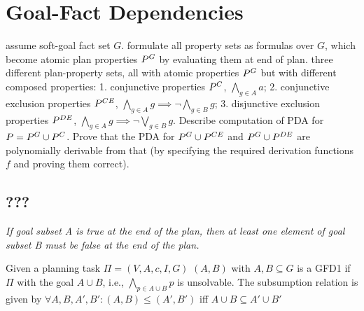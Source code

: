 \section{Goal-Fact Dependencies}


assume soft-goal fact set $G$. formulate all property sets as formulas
over $G$, which become atomic plan properties $P^{G}$ by
evaluating them at end of plan. three different plan-property sets,
all with atomic properties $P^{G}$ but with different composed
properties: 1. conjunctive properties $P^{C}$, $\bigwedge_{g \in
  A} a$; 2. conjunctive exclusion properties $P^{CE}$,
$\bigwedge_{g \in A} g \implies \neg \bigwedge_{g \in B} g$;
3. disjunctive exclusion properties $P^{DE}$, $\bigwedge_{g \in
  A} g \implies \neg \bigvee_{g \in B} g$. Describe computation of PDA
for $P = P^{G} \cup P^{C}$. Prove that the PDA for
$P^{G} \cup P^{CE}$ and $P^{G} \cup P^{DE}$ are
polynomially derivable from that (by specifying the required
derivation functions $f$ and proving them correct). 



\subsection{???}


\emph{If goal subset A is true at the end of the plan, then at least one element of goal subset B
must be false at the end of the plan.}


\begin{definition}
Given a planning task $\Pi = (V,A,c,I,G)$ $(A,B)$ with $A, B \subseteq G$ is a 
GFD1 if $\Pi$ with the goal $A \cup B$, i.e., $\bigwedge_{p \in A \cup B} p$
is unsolvable.
The subsumption relation is given by $\forall A,B,A',B': (A,B) \leq (A',B')$ iff $A \cup B \subseteq 
A' \cup B'$
\end{definition}

